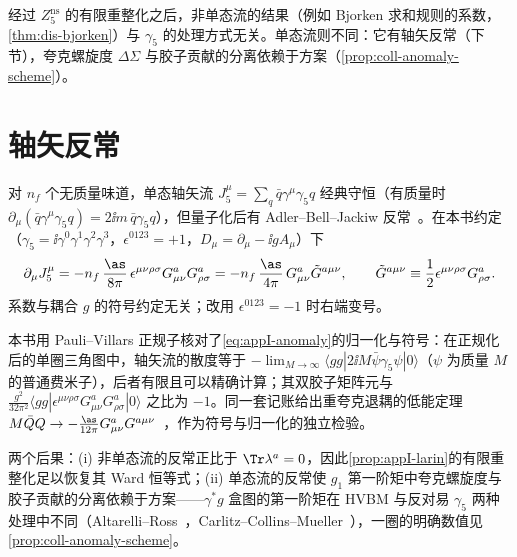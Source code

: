 经过 $Z_5^{\mathrm{ns}}$ 的有限重整化之后，非单态流的结果（例如 Bjorken 求和规则的系数，\cref{thm:dis-bjorken}）与 $\gamma_5$ 的处理方式无关。单态流则不同：它有轴矢反常（下节），夸克螺旋度 $\Delta\Sigma$ 与胶子贡献的分离依赖于方案（\cref{prop:coll-anomaly-scheme}）。

\section{轴矢反常}\label{sec:appI-anomaly}

\begin{remark}[轴矢反常]\label{rem:appI-anomaly}
对 $n_f$ 个无质量味道，单态轴矢流 $J_5^\mu=\sum_q\bar q\gamma^\mu\gamma_5q$ 经典守恒（有质量时 $\partial_\mu(\bar q\gamma^\mu\gamma_5q)=2\ii m\,\bar q\gamma_5q$），但量子化后有 Adler--Bell--Jackiw 反常~\cite{Adler:1969gk,Bell:1969ts}。在本书约定（$\gamma_5=\ii\gamma^0\gamma^1\gamma^2\gamma^3$，$\epsilon^{0123}=+1$，$D_\mu=\partial_\mu-\ii gA_\mu$）下
\begin{equation}\label{eq:appI-anomaly}
\partial_\mu J_5^\mu=-n_f\,\frac{\as}{8\pi}\,\epsilon^{\mu\nu\rho\sigma}G^a_{\mu\nu}G^a_{\rho\sigma}=-n_f\,\frac{\as}{4\pi}\,G^a_{\mu\nu}\tilde G^{a\mu\nu},\qquad \tilde G^{a\mu\nu}\equiv\frac12\epsilon^{\mu\nu\rho\sigma}G^a_{\rho\sigma}.
\end{equation}
系数与耦合 $g$ 的符号约定无关；改用 $\epsilon^{0123}=-1$ 时右端变号。

本书用 Pauli--Villars 正规子核对了\cref{eq:appI-anomaly}的归一化与符号：在正规化后的单圈三角图中，轴矢流的散度等于 $-\lim_{M\to\infty}\langle gg|2\ii M\bar\psi\gamma_5\psi|0\rangle$（$\psi$ 为质量 $M$ 的普通费米子），后者有限且可以精确计算；其双胶子矩阵元与 $\frac{g^2}{32\pi^2}\langle gg|\epsilon^{\mu\nu\rho\sigma}G^a_{\mu\nu}G^a_{\rho\sigma}|0\rangle$ 之比为 $-1$。同一套记账给出重夸克退耦的低能定理 $M\bar QQ\to-\frac{\as}{12\pi}G^a_{\mu\nu}G^{a\mu\nu}$~\cite{Shifman:1978zn}，作为符号与归一化的独立检验。

两个后果：(i) 非单态流的反常正比于 $\Tr\lambda^a=0$，因此\cref{prop:appI-larin}的有限重整化足以恢复其 Ward 恒等式；(ii) 单态流的反常使 $g_1$ 第一阶矩中夸克螺旋度与胶子贡献的分离依赖于方案——$\gamma^*g$ 盒图的第一阶矩在 HVBM 与反对易 $\gamma_5$ 两种处理中不同（Altarelli--Ross~\cite{AltarelliRoss1988}，Carlitz--Collins--Mueller~\cite{CarlitzCollinsMueller1988}），一圈的明确数值见\cref{prop:coll-anomaly-scheme}。
\end{remark}
